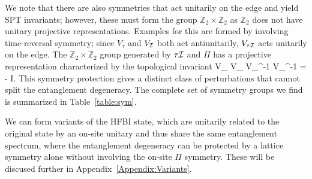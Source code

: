 We note that there are also symmetries that act unitarily on the edge and yield SPT invariants;
however, these must form the group $\mathbb{Z}_2 \times \mathbb{Z}_2$ as $\mathbb{Z}_2$
does not have unitary projective representations. Examples for this are formed by involving
time-reversal symmetry; since $V_{\tau}$ and $V_{\mathcal{I}}$ both act antiunitarily, $V_{\tau \mathcal{I}}$ acts
unitarily on the edge. The $\mathbb{Z}_2 \times \mathbb{Z}_2$ group generated by
$\tau \mathcal{I}$ and $\varPi$ has a projective representation characterized by the 
topological invariant
\beq
V_{\varPi} V_{\tau \I} V_{\varPi}^{-1} V_{\tau \I}^{-1}
 = - I.
\eeq
This symmetry protection gives a distinct class of perturbations that cannot
split the entanglement degeneracy.
The complete set of symmetry groups we find is summarized in Table~\ref{table:sym}.

We can form variants of the HFBI state, which are unitarily related to the original
state by an on-site unitary and thus share the same entanglement spectrum, where
the entanglement degeneracy can be protected by a lattice symmetry alone without involving
the on-site $\varPi$ symmetry. These will be discused further in Appendix~\ref{Appendix:Variants}.

